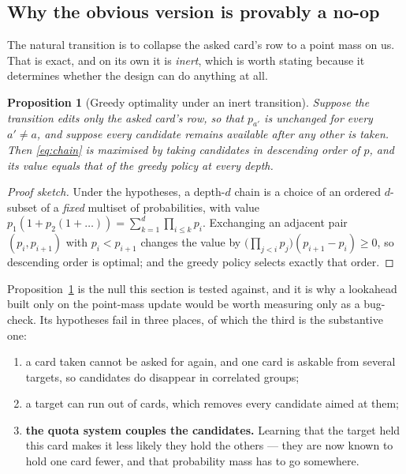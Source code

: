 \documentclass[11pt,a4paper]{article}
\newtheorem{proposition}{Proposition}
\begin{document}
\subsection{Why the obvious version is provably a no-op}

The natural transition is to collapse the asked card's row to a point mass on
us. That is exact, and on its own it is \emph{inert}, which is worth stating
because it determines whether the design can do anything at all.

\begin{proposition}[Greedy optimality under an inert transition]
\label{prop:greedy}
Suppose the transition edits only the asked card's row, so that $p_{a'}$ is
unchanged for every $a' \ne a$, and suppose every candidate remains available
after any other is taken. Then \eqref{eq:chain} is maximised by taking
candidates in descending order of $p$, and its value equals that of the greedy
policy at every depth.
\end{proposition}

\begin{proof}[Proof sketch]
Under the hypotheses, a depth-$d$ chain is a choice of an ordered $d$-subset of
a \emph{fixed} multiset of probabilities, with value
$p_{1}(1 + p_{2}(1 + \dots))= \sum_{k=1}^{d} \prod_{i \le k} p_{i}$. Exchanging
an adjacent pair $(p_i, p_{i+1})$ with $p_i < p_{i+1}$ changes the value by
$\bigl(\prod_{j<i} p_j\bigr)(p_{i+1} - p_i) \ge 0$, so descending order is
optimal; and the greedy policy selects exactly that order.
\end{proof}

Proposition~\ref{prop:greedy} is the null this section is tested against, and it
is why a lookahead built only on the point-mass update would be worth measuring
only as a bug-check. Its hypotheses fail in three places, of which the third is
the substantive one:

\begin{enumerate}
\item a card taken cannot be asked for again, and one card is askable from
several targets, so candidates do disappear in correlated groups;
\item a target can run out of cards, which removes every candidate aimed at
them;
\item \textbf{the quota system couples the candidates.} Learning that the target
held this card makes it less likely they hold the others --- they are now known
to hold one card fewer, and that probability mass has to go somewhere.
\end{enumerate}
\end{document}
